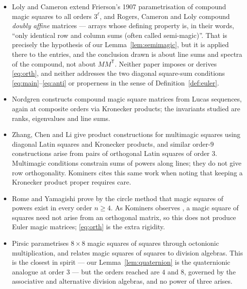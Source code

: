 \documentclass[11pt,a4paper]{amsart}
\theoremstyle{plain}
\theoremstyle{definition}
\theoremstyle{remark}
\newcommand{\tr}{\mathsf{T}}
\begin{document}
\begin{itemize}
\item Loly and Cameron \cite{LolyCameron2020} extend Frierson's 1907
  parametrisation of compound magic squares to all orders $3^{\ell}$, and
  Rogers, Cameron and Loly \cite{RogersCameronLoly2017} compound
  \emph{doubly affine} matrices --- arrays whose defining property is, in their
  words, ``only identical row and column sums (often called semi-magic)''. That
  is precisely the hypothesis of our Lemma~\ref{lem:semimagic}, but it is applied
  there to the entries, and the conclusion drawn is about line sums and spectra
  of the compound, not about $MM^{\tr}$. Neither paper imposes or derives
  \eqref{eq:orth}, and neither addresses the two diagonal square-sum conditions
  \eqref{eq:main}--\eqref{eq:anti} or properness in the sense of
  Definition~\ref{def:euler}.
\item Nordgren \cite{Nordgren2024} constructs compound magic square matrices
  from Lucas sequences, again at composite orders via Kronecker products; the
  invariants studied are ranks, eigenvalues and line sums.
\item Zhang, Chen and Li \cite{ZhangChenLi2015} give product constructions for
  multimagic squares using diagonal Latin squares and Kronecker products, and
  similar order-$9$ constructions arise from pairs of orthogonal Latin squares of
  order $3$. Multimagic conditions constrain sums of powers along lines; they do
  not give row orthogonality. Kominers cites this same work
  \cite[\S5]{Kominers2026} when noting that keeping a Kronecker product proper
  requires care.
\item Rome and Yamagishi \cite{RomeYamagishi2025} prove by the circle method
  that magic squares of powers exist in every order $n\ge4$. As Kominers observes
  \cite[\S1]{Kominers2026}, a magic square of squares need not arise from an
  orthogonal matrix, so this does not produce Euler magic matrices;
  \eqref{eq:orth} is the extra rigidity.
\item Pirsic \cite{Pirsic2019,Pirsic2020} parametrises $8\times8$ magic squares
  of squares through octonionic multiplication, and relates magic squares of
  squares to division algebras. This is the closest in spirit --- our
  Lemma~\ref{lem:quaternion} is the quaternionic analogue at order $3$ --- but the
  orders reached are $4$ and $8$, governed by the associative and alternative
  division algebras, and no power of three arises.
\end{itemize}
\end{document}
